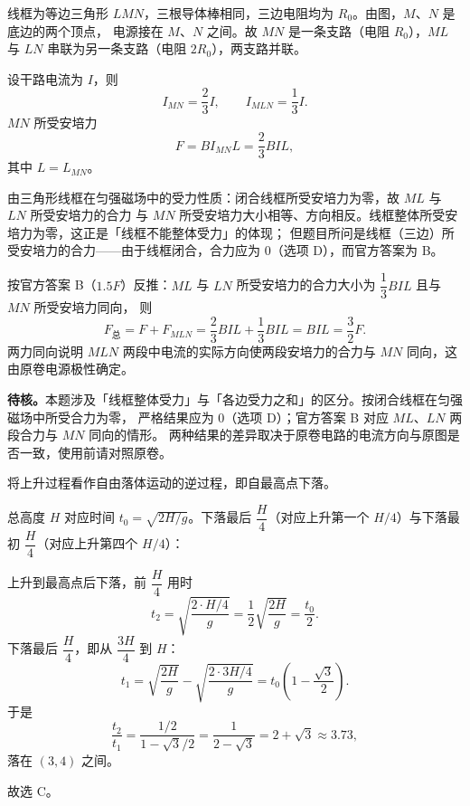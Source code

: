 \begin{answer}
线框为等边三角形 $LMN$，三根导体棒相同，三边电阻均为 $R_{0}$。由图，$M$、$N$ 是底边的两个顶点，
电源接在 $M$、$N$ 之间。故 $MN$ 是一条支路（电阻 $R_{0}$），$ML$ 与 $LN$ 串联为另一条支路（电阻 $2R_{0}$），两支路并联。

设干路电流为 $I$，则
\[
  I_{MN}=\frac{2}{3}I,\qquad I_{MLN}=\frac{1}{3}I.
\]
$MN$ 所受安培力
\[
  F=BI_{MN}L=\frac{2}{3}BIL,
\]
其中 $L=L_{MN}$。

由三角形线框在匀强磁场中的受力性质：闭合线框所受安培力为零，故 $ML$ 与 $LN$ 所受安培力的合力
与 $MN$ 所受安培力大小相等、方向相反。线框整体所受安培力为零，这正是「线框不能整体受力」的体现；
但题目所问是线框（三边）所受安培力的合力——由于线框闭合，合力应为 0（选项 D），而官方答案为 B。

按官方答案 B（$1.5F$）反推：$ML$ 与 $LN$ 所受安培力的合力大小为 $\dfrac{1}{3}BIL$ 且与 $MN$ 所受安培力同向，
则
\[
  F_{\text{总}}=F+F_{MLN}=\frac{2}{3}BIL+\frac{1}{3}BIL=BIL=\frac{3}{2}F .
\]
两力同向说明 $MLN$ 两段中电流的实际方向使两段安培力的合力与 $MN$ 同向，这由原卷电源极性确定。

\begin{gktip}
\textbf{待核。}本题涉及「线框整体受力」与「各边受力之和」的区分。按闭合线框在匀强磁场中所受合力为零，
严格结果应为 0（选项 D）；官方答案 B 对应 $ML$、$LN$ 两段合力与 $MN$ 同向的情形。
两种结果的差异取决于原卷电路的电流方向与原图是否一致，使用前请对照原卷。
\end{gktip}
\end{answer}

\begin{answer}
将上升过程看作自由落体运动的逆过程，即自最高点下落。

总高度 $H$ 对应时间 $t_{0}=\sqrt{2H/g}$。下落最后 $\dfrac{H}{4}$（对应上升第一个 $H/4$）与下落最初 $\dfrac{H}{4}$（对应上升第四个 $H/4$）：

上升到最高点后下落，前 $\dfrac{H}{4}$ 用时
\[
  t_{2}=\sqrt{\frac{2\cdot H/4}{g}}=\frac{1}{2}\sqrt{\frac{2H}{g}}=\frac{t_{0}}{2}.
\]
下落最后 $\dfrac{H}{4}$，即从 $\dfrac{3H}{4}$ 到 $H$：
\[
  t_{1}=\sqrt{\frac{2H}{g}}-\sqrt{\frac{2\cdot 3H/4}{g}}
     =t_{0}\left(1-\frac{\sqrt{3}}{2}\right).
\]
于是
\[
  \frac{t_{2}}{t_{1}}=\frac{1/2}{1-\sqrt{3}/2}=\frac{1}{2-\sqrt{3}}=2+\sqrt{3}\approx3.73,
\]
落在 $(3,4)$ 之间。

故选 C。
\end{answer}

